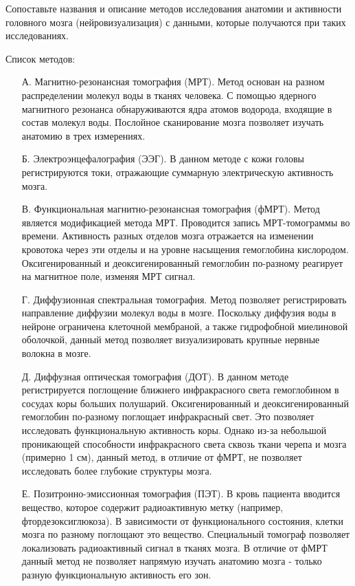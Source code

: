 
Сопоставьте названия и описание методов исследования анатомии и активности головного мозга (нейровизуализация) с данными, которые получаются при таких исследованиях.

Список методов:
\begin{enumerate}
    \item[А.] Магнитно-резонансная томография (МРТ). Метод основан на разном распределении молекул воды в тканях человека. С помощью ядерного магнитного резонанса обнаруживаются ядра атомов водорода, входящие в состав молекул воды. Послойное сканирование мозга позволяет изучать анатомию в трех измерениях.
    \item[Б.] Электроэнцефалография (ЭЭГ). В данном методе с кожи головы регистрируются токи, отражающие суммарную электрическую активность мозга.
    \item[В.] Функциональная магнитно-резонансная томография (фМРТ). Метод является модификацией метода МРТ. Проводится запись МРТ-томограммы во времени. Активность разных отделов мозга отражается на изменении кровотока через эти отделы и на уровне насыщения гемоглобина кислородом. Оксигенированный и деоксигенированный гемоглобин по-разному реагирует на магнитное поле, изменяя МРТ сигнал.
    \item[Г.] Диффузионная спектральная томография. Метод позволяет регистрировать направление диффузии молекул воды в мозге. Поскольку диффузия воды в нейроне ограничена клеточной мембраной, а также гидрофобной миелиновой оболочкой, данный метод позволяет визуализировать крупные нервные волокна в мозге.
    \item[Д.] Диффузная оптическая томография (ДОТ). В данном методе регистрируется поглощение ближнего инфракрасного света гемоглобином в сосудах коры больших полушарий. Оксигенированный и деоксигенированный гемоглобин по-разному поглощает инфракрасный свет. Это позволяет исследовать функциональную активность коры. Однако из-за небольшой проникающей способности инфракрасного света сквозь ткани черепа и мозга (примерно 1 см), данный метод, в отличие от фМРТ, не позволяет исследовать более глубокие структуры мозга.
    \item[Е.] Позитронно-эмиссионная томография (ПЭТ). В кровь пациента вводится вещество, которое содержит радиоактивную метку (например, фтордезоксиглюкоза). В зависимости от функционального состояния, клетки мозга по разному поглощают это вещество. Специальный томограф позволяет локализовать радиоактивный сигнал в тканях мозга. В отличие от фМРТ данный метод не позволяет напрямую изучать анатомию мозга - только разную функциональную активность его зон.
\end{enumerate}

